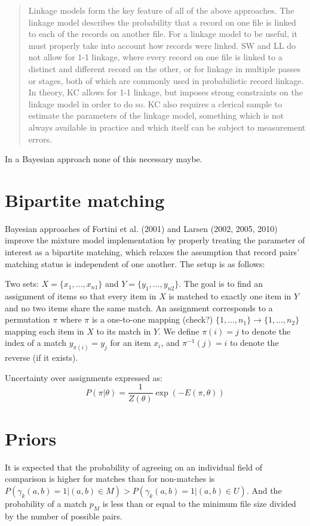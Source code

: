 \documentclass[11pt,reqno]{amsart}
\begin{document}
\begin{quote}
Linkage models form the key feature of all of the above approaches. The linkage model
describes the probability that a record on one file is linked to each of the records on another
file. For a linkage model to be useful, it must properly take into account how records were
linked. SW and LL do not allow for 1-1 linkage, where every record on one file is linked to
a distinct and different record on the other, or for linkage in multiple passes or stages,
both of which are commonly used in probabilistic record linkage. In theory, KC allows
for 1-1 linkage, but imposes strong constraints on the linkage model in order to do so.
KC also requires a clerical sample to estimate the parameters of the linkage model,
something which is not always available in practice and which itself can be subject to
measurement errors.
\end{quote}

In a Bayesian approach none of this necessary maybe. 



\section{Bipartite matching}
Bayesian approaches of Fortini et al. (2001) and Larsen (2002, 2005, 2010) improve the mixture model implementation by properly treating the parameter of interest as a bipartite matching, which relaxes the assumption that record pairs' matching status is independent of one another.  The setup is as follows:

Two sets: $X = \{x_1, \dots, x_{n1}\}$ and $Y = \{y_1, \dots, y_{n2}\}$. The goal is to find an assignment of items so that every item in $X$ is matched to exactly one item in $Y$ and no two items share the same match.  An assignment corresponds to a permutation $\pi$ where $\pi$ is a one-to-one mapping (check?) $\{1, \dots, n_1\} \to \{1, \dots, n_2\}$ mapping each item in $X$ to its match in $Y$.  We define $\pi(i) = j$ to denote the index of a match $y_{\pi(i)} = y_j$ for an item $x_i$, and $\pi^{-1}(j) = i$ to denote the reverse (if it exists). 

Uncertainty over assignments expressed as:
\[ P(\pi | \theta)  = \frac{1}{Z(\theta)} \exp(-E(\pi,\theta))\]


\section{Priors} 
It is expected that the probability of agreeing on an individual field of comparison is higher for matches than for non-matches is $P(\gamma_k(a,b) = 1 | (a,b) \in M) > P (\gamma_k(a, b) = 1 | (a,b) \in U) $.  And the probability of a match $p_M$ is less than or equal to the minimum file size divided by the number of possible pairs.  
\end{document}
